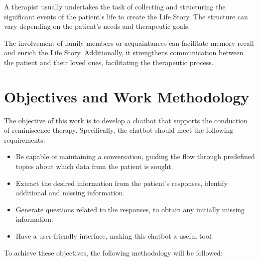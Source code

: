 A therapist usually undertakes the task of collecting and structuring the significant events of the patient's life to create the Life Story. The structure can vary depending on the patient's needs and therapeutic goals.

The involvement of family members or acquaintances can facilitate memory recall and enrich the Life Story. Additionally, it strengthens communication between the patient and their loved ones, facilitating the therapeutic process.

\section{Objectives and Work Methodology}
\label{sec:objectives}

The objective of this work is to develop a chatbot that supports the conduction of reminiscence therapy. Specifically, the chatbot should meet the following requirements:

\begin{itemize}
	\item Be capable of maintaining a conversation, guiding the flow through predefined topics about which data from the patient is sought.
	\item Extract the desired information from the patient's responses, identify additional and missing information.
	\item Generate questions related to the responses, to obtain any initially missing information.
	\item Have a user-friendly interface, making this chatbot a useful tool.
\end{itemize}


To achieve these objectives, the following methodology will be followed:

